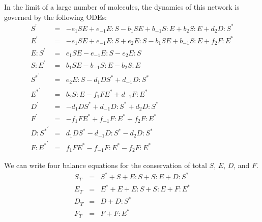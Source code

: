 \documentclass[aip,jcp,reprint,twocolumn]{revtex4-1}
\begin{document}
\begin{widetext}
In the limit of a large number of molecules, the dynamics of this network is governed by the following ODEs:
\begin{equation}
    \begin{array}{rcl}
        S^\prime & = & -e_1 S E + e_{-1} E:S -b_1 S E + b_{-1} S:E + b_2 S:E + d_2 D:S^{*} \\
        E^\prime & = & -e_1 S E + e_{-1} E:S + e_2 E:S - b_1 S E +b_{-1} S:E + f_2 F:E^{*} \\
        E:S^\prime & = & e_1 S E -e_{-1} E:S -e_2 E:S \\
        S:E^\prime & = & b_1 S E -b_{-1} S:E -b_2 S:E \\
        {S^{*}}^\prime & = & e_2 E:S -d_1 D S^{*} + d_{-1} D:S^{*} \\
        {E^{*}}^\prime & = & b_2 S:E -f_1 F E^{*} + d_{-1} F:E^{*} \\
        D^\prime & = & -d_1 D S^{*} + d_{-1} D:S^{*} + d_2 D:S^{*} \\
        F^\prime & = & -f_1 F E^{*} + f_{-1} F:E^{*} + f_2 F:E^{*} \\
        {D:S^{*}}^\prime & = & d_1 D S^{*} - d_{-1} D:S^{*} -d_2 D:S^{*} \\
        {F:E^{*}}^\prime & = & f_1 FE^{*} - f_{-1} F:E^{*} -f_2 F:E^{*}
    \end{array}
\end{equation}
\end{widetext}

We can write four balance equations for the conservation of total $S$, $E$, $D$, and $F$.
\begin{equation}
    \begin{array}{rcl}
        S_T & = & S^{*} + S + E:S + S:E + D:S^{*} \\
        E_T & = & E^{*} + E + E:S + S:E + F:E^{*} \\
        D_T & = & D + D:S^{*} \\
        F_T & = & F + F:E^{*}
    \end{array}
\end{equation}
\end{document}

